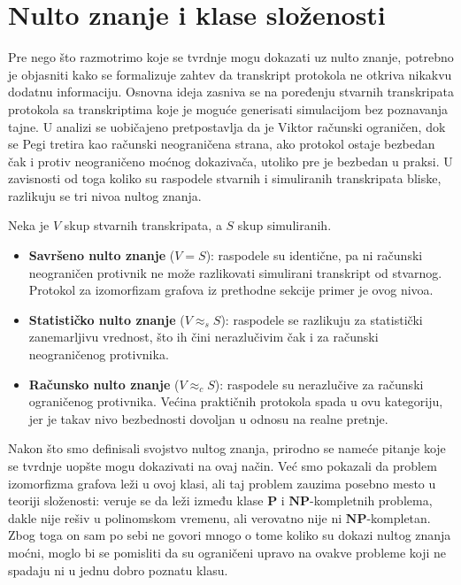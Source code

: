 \section{Nulto znanje i klase složenosti}

Pre nego što razmotrimo koje se tvrdnje mogu dokazati uz nulto znanje, 
potrebno je objasniti kako se formalizuje zahtev da transkript 
protokola ne otkriva nikakvu dodatnu informaciju. 
Osnovna ideja zasniva se na poređenju stvarnih transkripata protokola 
sa transkriptima koje je moguće generisati simulacijom bez poznavanja 
tajne. U analizi se uobičajeno pretpostavlja da je Viktor računski 
ograničen, dok se Pegi tretira kao računski neograničena strana, ako 
protokol ostaje bezbedan čak i protiv neograničeno moćnog dokazivača, 
utoliko pre je bezbedan u praksi. U zavisnosti od toga koliko su 
raspodele stvarnih i simuliranih transkripata bliske, razlikuju se tri 
nivoa nultog znanja. 

Neka je $V$ skup stvarnih transkripata, a $S$ skup simuliranih.

\begin{itemize}
  \item \textbf{Savršeno nulto znanje} ($V=S$): raspodele su identične, 
  pa ni računski neograničen protivnik ne može razlikovati simulirani 
  transkript od stvarnog. Protokol za izomorfizam grafova iz prethodne 
  sekcije primer je ovog nivoa.
  
  \item \textbf{Statističko nulto znanje} ($V\approx_s S$): raspodele se 
  razlikuju za statistički zanemarljivu vrednost, što ih čini nerazlučivim 
  čak i za računski neograničenog protivnika.
  
  \item \textbf{Računsko nulto znanje} ($V\approx_c S$): raspodele su 
  nerazlučive za računski ograničenog protivnika. Većina praktičnih 
  protokola spada u ovu kategoriju, jer je takav nivo bezbednosti 
  dovoljan u odnosu na realne pretnje.
\end{itemize}

Nakon što smo definisali svojstvo nultog znanja, prirodno se nameće 
pitanje koje se tvrdnje uopšte mogu dokazivati na ovaj način. Već smo 
pokazali da problem izomorfizma grafova leži u ovoj klasi, ali taj 
problem zauzima posebno mesto u teoriji složenosti: veruje se da leži 
između klase $\mathbf{P}$ i $\mathbf{NP}$-kompletnih problema, dakle nije rešiv 
u polinomskom vremenu, ali verovatno nije ni $\mathbf{NP}$-kompletan. Zbog toga 
on sam po sebi ne govori mnogo o tome koliko su dokazi nultog znanja 
moćni, moglo bi se pomisliti da su ograničeni upravo na ovakve 
probleme koji ne spadaju ni u jednu dobro poznatu klasu.

